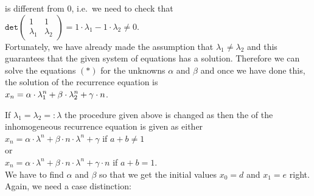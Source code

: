 \begin{enumerate}
\begin{enumerate}
            is different from $0$, i.e.~we need to check that
            \\[0.2cm]
            \hspace*{1.3cm}
            $\texttt{det}\left(
              \begin{array}{cc}
                1         & 1        \\
                \lambda_1 & \lambda_2  
              \end{array}
               \right) = 1 \cdot \lambda_1 - 1 \cdot \lambda_2
            \not= 0$.
            \\[0.2cm]
            Fortunately, we have already made the assumption that $\lambda_1 \not= \lambda_2$ and this
            guarantees that the given system of equations has a solution.
            Therefore we can solve the equations $(*)$ for the unknowns $\alpha$ and $\beta$ and once we have
            done this, the solution of the recurrence equation is
            \\[0.2cm]
            \hspace*{1.3cm}
            $\displaystyle x_{n} = \alpha \cdot \lambda_1^n + \beta \cdot \lambda_2^n + \gamma \cdot n$.
      \end{enumerate}
\end{enumerate}
If $\lambda_1 = \lambda_2 =: \lambda$  the procedure given above is changed as then the  of
the inhomogeneous recurrence equation is given as either
\\[0.2cm]
\hspace*{1.3cm}
$x_n = \alpha \cdot \lambda^n + \beta \cdot n \cdot \lambda^n + \gamma$ \quad if $a + b \not= 1$
\\[0.2cm]
or
\\[0.2cm]
\hspace*{1.3cm}
$x_n = \alpha \cdot \lambda^n + \beta \cdot n \cdot \lambda^n + \gamma \cdot n$ \quad if $a + b = 1$.
\\[0.2cm]
We have to find $\alpha$ and $\beta$ so that we get the initial values $x_0 = d$ and $x_1 = e$ right.
Again, we need a case distinction:
